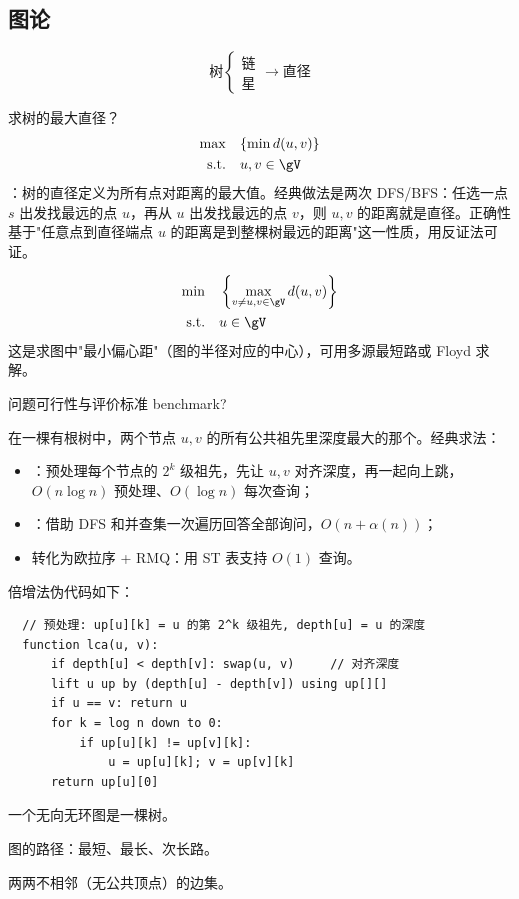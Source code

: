 \documentclass[12pt]{article}
\begin{document}
\subsection{图论}
\begin{note}
  \[
    \text{树}\begin{cases}
      \text{链} \\
      \text{星}
    \end{cases}\rightarrow\text{直径}
  \]
\end{note}
\begin{exam}
  求树的最大直径？
  \[
    \begin{aligned}
      \max\quad        & \{\min d(u,v)\} \\
      \text{s.t.}\quad & u,v\in \gV
    \end{aligned}
  \]
  ：树的直径定义为所有点对距离的最大值。经典做法是两次 DFS/BFS：任选一点 $s$ 出发找最远的点 $u$，再从 $u$ 出发找最远的点 $v$，则 $u,v$ 的距离就是直径。正确性基于"任意点到直径端点 $u$ 的距离是到整棵树最远的距离"这一性质，用反证法可证。

  \[
    \begin{aligned}
      \min\quad        & \left\{\max\limits_{v\neq u,v\in\gV}d(u,v)\right\} \\
      \text{s.t.}\quad & u\in\gV
    \end{aligned}
  \]
  这是求图中"最小偏心距"（图的半径对应的中心），可用多源最短路或 Floyd 求解。
\end{exam}
\begin{note}
  问题可行性与评价标准 benchmark?
\end{note}
\begin{defn}
  在一棵有根树中，两个节点 $u,v$ 的所有公共祖先里深度最大的那个。经典求法：
  \begin{itemize}
    \item {}：预处理每个节点的 $2^k$ 级祖先，先让 $u,v$ 对齐深度，再一起向上跳，$O(n\log n)$ 预处理、$O(\log n)$ 每次查询；
    \item {}：借助 DFS 和并查集一次遍历回答全部询问，$O(n+\alpha(n))$；
    \item 转化为欧拉序 + RMQ：用 ST 表支持 $O(1)$ 查询。
  \end{itemize}
  倍增法伪代码如下：
  \begin{verbatim}
  // 预处理: up[u][k] = u 的第 2^k 级祖先, depth[u] = u 的深度
  function lca(u, v):
      if depth[u] < depth[v]: swap(u, v)     // 对齐深度
      lift u up by (depth[u] - depth[v]) using up[][]
      if u == v: return u
      for k = log n down to 0:
          if up[u][k] != up[v][k]:
              u = up[u][k]; v = up[v][k]
      return up[u][0]
  \end{verbatim}
\end{defn}
\begin{note}
  一个无向无环图是一棵树。
\end{note}
\begin{note}
  图的路径：最短、最长、次长路。
\end{note}
\begin{defn}[匹配（matching）]
  两两不相邻（无公共顶点）的边集。
\end{defn}
\end{document}
